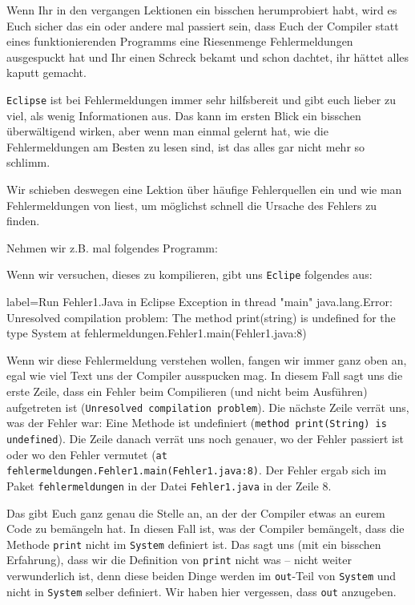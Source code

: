 
Wenn Ihr in den vergangen Lektionen ein bisschen herumprobiert habt, wird es
Euch sicher das ein oder andere mal passiert sein, dass Euch der Compiler statt
eines funktionierenden Programms eine Riesenmenge Fehlermeldungen ausgespuckt
hat und Ihr einen Schreck bekamt und schon dachtet, ihr hättet alles kaputt
gemacht.

\texttt{Eclipse} ist bei Fehlermeldungen immer sehr hilfsbereit und gibt
euch lieber zu viel, als wenig Informationen aus. Das kann im ersten Blick ein
bisschen überwältigend wirken, aber wenn man einmal gelernt hat, wie die
Fehlermeldungen am Besten zu lesen sind, ist das alles gar nicht mehr so
schlimm.

Wir schieben deswegen eine Lektion über häufige Fehlerquellen ein und wie man
Fehlermeldungen von \Eclipse liest, um möglichst schnell die Ursache des Fehlers
zu finden.

Nehmen wir z.B. mal folgendes Programm:


Wenn wir versuchen, dieses zu kompilieren, gibt uns \texttt{Eclipe} folgendes
aus:

{\small
\begin{textcode*}{label=Run Fehler1.Java in Eclipse}
Exception in thread "main" java.lang.Error: Unresolved compilation problem:
  The method print(string) is undefined for the type System
  at fehlermeldungen.Fehler1.main(Fehler1.java:8)
\end{textcode*}
}

Wenn wir diese Fehlermeldung verstehen wollen, fangen wir immer ganz oben an,
egal wie viel Text uns der Compiler ausspucken mag. In diesem Fall sagt uns die
erste Zeile, dass ein Fehler beim Compilieren (und nicht beim Ausführen)
aufgetreten ist (\texttt{Unresolved compilation problem}). Die nächste Zeile
verrät uns, was der Fehler war: Eine Methode ist undefiniert (\texttt{method
print(String) is undefined}). Die Zeile danach verrät uns noch genauer, wo der
Fehler passiert ist oder wo \Eclipse den Fehler vermutet (\texttt{at
fehlermeldungen.Fehler1.main(Fehler1.java:8)}. Der Fehler ergab sich im
Paket \texttt{fehlermeldungen} in der Datei \texttt{Fehler1.java} in der Zeile
8.

Das gibt Euch ganz genau die Stelle an, an der der Compiler etwas an eurem Code
zu bemängeln hat. In diesen Fall ist, was der Compiler bemängelt, dass die
Methode \texttt{print} nicht im \texttt{System} definiert ist. Das sagt uns (mit
ein bisschen Erfahrung), dass wir die Definition von \texttt{print} nicht was --
nicht weiter verwunderlich ist, denn diese beiden Dinge werden
im \texttt{out}-Teil von \texttt{System} und nicht in \texttt{System} selber
definiert. Wir haben hier vergessen, dass \texttt{out} anzugeben.

